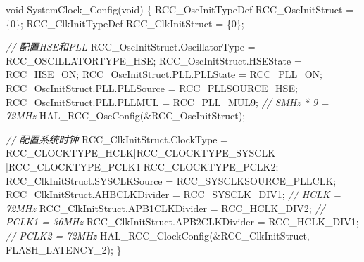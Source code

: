 \documentclass[
  chinese,
  UTF8,
  oneside,
  openany]{ctexbook}
\newenvironment{Shaded}{}{}
\newcommand{\CommentTok}[1]{\textcolor[rgb]{0.38,0.63,0.69}{\textit{#1}}}
\newcommand{\DataTypeTok}[1]{\textcolor[rgb]{0.56,0.13,0.00}{#1}}
\newcommand{\DecValTok}[1]{\textcolor[rgb]{0.25,0.63,0.44}{#1}}
\newcommand{\NormalTok}[1]{#1}
\newcommand{\OperatorTok}[1]{\textcolor[rgb]{0.40,0.40,0.40}{#1}}
\begin{document}
\begin{Shaded}
\begin{Highlighting}[]
\DataTypeTok{void}\NormalTok{ SystemClock\_Config}\OperatorTok{(}\DataTypeTok{void}\OperatorTok{)}
\OperatorTok{\{}
\NormalTok{  RCC\_OscInitTypeDef RCC\_OscInitStruct }\OperatorTok{=} \OperatorTok{\{}\DecValTok{0}\OperatorTok{\};}
\NormalTok{  RCC\_ClkInitTypeDef RCC\_ClkInitStruct }\OperatorTok{=} \OperatorTok{\{}\DecValTok{0}\OperatorTok{\};}

  \CommentTok{// 配置HSE和PLL}
\NormalTok{  RCC\_OscInitStruct}\OperatorTok{.}\NormalTok{OscillatorType }\OperatorTok{=}\NormalTok{ RCC\_OSCILLATORTYPE\_HSE}\OperatorTok{;}
\NormalTok{  RCC\_OscInitStruct}\OperatorTok{.}\NormalTok{HSEState }\OperatorTok{=}\NormalTok{ RCC\_HSE\_ON}\OperatorTok{;}
\NormalTok{  RCC\_OscInitStruct}\OperatorTok{.}\NormalTok{PLL}\OperatorTok{.}\NormalTok{PLLState }\OperatorTok{=}\NormalTok{ RCC\_PLL\_ON}\OperatorTok{;}
\NormalTok{  RCC\_OscInitStruct}\OperatorTok{.}\NormalTok{PLL}\OperatorTok{.}\NormalTok{PLLSource }\OperatorTok{=}\NormalTok{ RCC\_PLLSOURCE\_HSE}\OperatorTok{;}
\NormalTok{  RCC\_OscInitStruct}\OperatorTok{.}\NormalTok{PLL}\OperatorTok{.}\NormalTok{PLLMUL }\OperatorTok{=}\NormalTok{ RCC\_PLL\_MUL9}\OperatorTok{;}  \CommentTok{// 8MHz * 9 = 72MHz}
\NormalTok{  HAL\_RCC\_OscConfig}\OperatorTok{(\&}\NormalTok{RCC\_OscInitStruct}\OperatorTok{);}

  \CommentTok{// 配置系统时钟}
\NormalTok{  RCC\_ClkInitStruct}\OperatorTok{.}\NormalTok{ClockType }\OperatorTok{=}\NormalTok{ RCC\_CLOCKTYPE\_HCLK}\OperatorTok{|}\NormalTok{RCC\_CLOCKTYPE\_SYSCLK}
                              \OperatorTok{|}\NormalTok{RCC\_CLOCKTYPE\_PCLK1}\OperatorTok{|}\NormalTok{RCC\_CLOCKTYPE\_PCLK2}\OperatorTok{;}
\NormalTok{  RCC\_ClkInitStruct}\OperatorTok{.}\NormalTok{SYSCLKSource }\OperatorTok{=}\NormalTok{ RCC\_SYSCLKSOURCE\_PLLCLK}\OperatorTok{;}
\NormalTok{  RCC\_ClkInitStruct}\OperatorTok{.}\NormalTok{AHBCLKDivider }\OperatorTok{=}\NormalTok{ RCC\_SYSCLK\_DIV1}\OperatorTok{;}    \CommentTok{// HCLK = 72MHz}
\NormalTok{  RCC\_ClkInitStruct}\OperatorTok{.}\NormalTok{APB1CLKDivider }\OperatorTok{=}\NormalTok{ RCC\_HCLK\_DIV2}\OperatorTok{;}     \CommentTok{// PCLK1 = 36MHz}
\NormalTok{  RCC\_ClkInitStruct}\OperatorTok{.}\NormalTok{APB2CLKDivider }\OperatorTok{=}\NormalTok{ RCC\_HCLK\_DIV1}\OperatorTok{;}     \CommentTok{// PCLK2 = 72MHz}
\NormalTok{  HAL\_RCC\_ClockConfig}\OperatorTok{(\&}\NormalTok{RCC\_ClkInitStruct}\OperatorTok{,}\NormalTok{ FLASH\_LATENCY\_2}\OperatorTok{);}
\OperatorTok{\}}
\end{Highlighting}
\end{Shaded}
\end{document}

